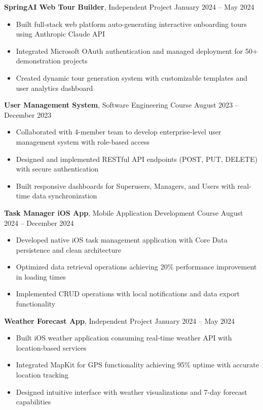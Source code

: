 \documentclass[10pt, letterpaper]{article}
\begin{document}
\textbf{SpringAI Web Tour Builder}, Independent Project \hfill January 2024 -- May 2024 
\begin{itemize}[leftmargin=0.5cm, itemsep=0.1cm]
    \item Built full-stack web platform auto-generating interactive onboarding tours using Anthropic Claude API
    \item Integrated Microsoft OAuth authentication and managed deployment for 50+ demonstration projects
    \item Created dynamic tour generation system with customizable templates and user analytics dashboard
\end{itemize}

\textbf{User Management System}, Software Engineering Course \hfill August 2023 -- December 2023 
\begin{itemize}[leftmargin=0.5cm, itemsep=0.1cm]
    \item Collaborated with 4-member team to develop enterprise-level user management system with role-based access
    \item Designed and implemented RESTful API endpoints (POST, PUT, DELETE) with secure authentication
    \item Built responsive dashboards for Superusers, Managers, and Users with real-time data synchronization
\end{itemize}

\textbf{Task Manager iOS App}, Mobile Application Development Course \hfill August 2024 -- December 2024 
\begin{itemize}[leftmargin=0.5cm, itemsep=0.1cm]
    \item Developed native iOS task management application with Core Data persistence and clean architecture
    \item Optimized data retrieval operations achieving 20\% performance improvement in loading times
    \item Implemented CRUD operations with local notifications and data export functionality
\end{itemize}

\textbf{Weather Forecast App}, Independent Project \hfill January 2024 -- May 2024 
\begin{itemize}[leftmargin=0.5cm, itemsep=0.1cm]
    \item Built iOS weather application consuming real-time weather API with location-based services
    \item Integrated MapKit for GPS functionality achieving 95\% uptime with accurate location tracking
    \item Designed intuitive interface with weather visualizations and 7-day forecast capabilities
\end{itemize}
\end{document}
